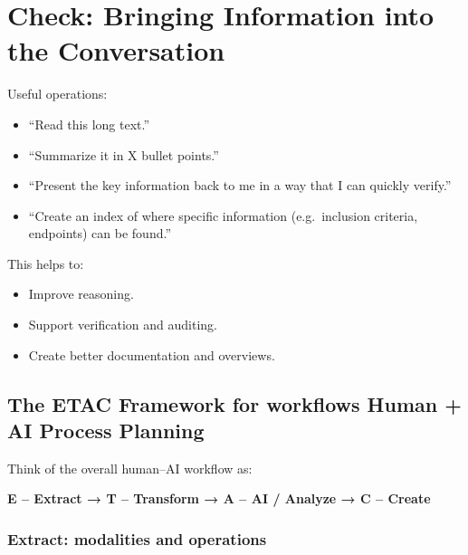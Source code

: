\documentclass[
  letterpaper,
  DIV=11,
  numbers=noendperiod]{scrreprt}
\providecommand{\tightlist}{%
  \setlength{\itemsep}{0pt}\setlength{\parskip}{0pt}}
\begin{document}
\section{Check: Bringing Information into the
Conversation}\label{check-bringing-information-into-the-conversation}

Useful operations:

\begin{itemize}
\tightlist
\item
  ``Read this long text.''
\item
  ``Summarize it in X bullet points.''
\item
  ``Present the key information back to me in a way that I can quickly
  verify.''
\item
  ``Create an index of where specific information (e.g.~inclusion
  criteria, endpoints) can be found.''
\end{itemize}

This helps to:

\begin{itemize}
\tightlist
\item
  Improve reasoning.
\item
  Support verification and auditing.
\item
  Create better documentation and overviews.
\end{itemize}

\subsection{The ETAC Framework for workflows Human + AI Process
Planning}\label{the-etac-framework-for-workflows-human-ai-process-planning}

Think of the overall human--AI workflow as:

\textbf{E -- Extract → T -- Transform → A -- AI / Analyze → C -- Create}

\subsubsection{Extract: modalities and
operations}\label{extract-modalities-and-operations}
\end{document}
